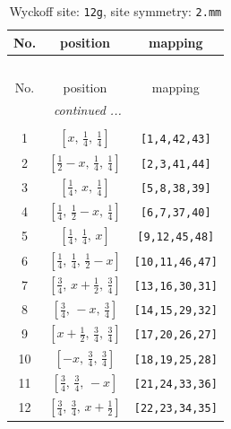 \documentclass[fleqn,8pt]{jsarticle}
\begin{document}
\begin{longtable}{ccc}
\caption{Wyckoff site: {\tt 12g}, site symmetry: {\tt 2.mm}}
 \\
 \hline \hline
No. & position & mapping \\ \hline \endfirsthead

\multicolumn{2}{l}{\tablename\ \thetable{}} \\
 \hline \hline
No. & position & mapping \\ \hline \endhead

 \hline \hline
\multicolumn{2}{r}{\footnotesize\it continued ...} \\ \endfoot

 \hline \hline
\multicolumn{2}{r}{} \\ \endlastfoot

1 & $\left[ x,\, \frac{1}{4},\, \frac{1}{4} \right]$ & {\tt [1,4,42,43]} \\ \hline
2 & $\left[ \frac{1}{2} - x,\, \frac{1}{4},\, \frac{1}{4} \right]$ & {\tt [2,3,41,44]} \\ \hline
3 & $\left[ \frac{1}{4},\, x,\, \frac{1}{4} \right]$ & {\tt [5,8,38,39]} \\ \hline
4 & $\left[ \frac{1}{4},\, \frac{1}{2} - x,\, \frac{1}{4} \right]$ & {\tt [6,7,37,40]} \\ \hline
5 & $\left[ \frac{1}{4},\, \frac{1}{4},\, x \right]$ & {\tt [9,12,45,48]} \\ \hline
6 & $\left[ \frac{1}{4},\, \frac{1}{4},\, \frac{1}{2} - x \right]$ & {\tt [10,11,46,47]} \\ \hline
7 & $\left[ \frac{3}{4},\, x + \frac{1}{2},\, \frac{3}{4} \right]$ & {\tt [13,16,30,31]} \\ \hline
8 & $\left[ \frac{3}{4},\, - x,\, \frac{3}{4} \right]$ & {\tt [14,15,29,32]} \\ \hline
9 & $\left[ x + \frac{1}{2},\, \frac{3}{4},\, \frac{3}{4} \right]$ & {\tt [17,20,26,27]} \\ \hline
10 & $\left[ - x,\, \frac{3}{4},\, \frac{3}{4} \right]$ & {\tt [18,19,25,28]} \\ \hline
11 & $\left[ \frac{3}{4},\, \frac{3}{4},\, - x \right]$ & {\tt [21,24,33,36]} \\ \hline
12 & $\left[ \frac{3}{4},\, \frac{3}{4},\, x + \frac{1}{2} \right]$ & {\tt [22,23,34,35]} \\
\end{longtable}
\renewcommand{\arraystretch}{1.2}
\end{document}

